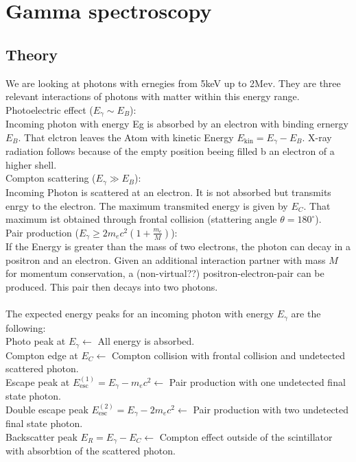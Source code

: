 \documentclass[a4paper,12pt]{article}
\begin{document}
\newpage

\section{Gamma spectroscopy}

\subsection{Theory}
We are looking at photons with ernegies from 5keV up to 2Mev. They are three relevant interactions of photons with matter within this energy range.\\
Photoelectric effect ($E_\gamma \sim E_B$):\\
Incoming photon with energy Eg is absorbed by an electron with binding ernergy $E_B$. That elctron leaves the Atom with kinetic Energy $E_{\mathrm{kin}} = E_\gamma - E_B$. X-ray radiation follows because of the empty position beeing filled b an electron of a higher shell.\\
Compton scattering ($E_\gamma \gg E_B$):\\
Incoming Photon is scattered at an electron. It is not absorbed but transmits enrgy to the electron. The maximum transmited energy is given by $E_C$. That maximum ist obtained through frontal collision (stattering angle $\theta = 180^\circ$).\\
Pair production ($E_\gamma \geqslant 2m_ec^2(1+\frac{m_e}{M})$):\\
If the Energy is greater than the mass of two electrons, the photon can decay in a positron and an electron. Given an additional interaction partner with mass $M$ for momentum conservation, a (non-virtual??) positron-electron-pair can be produced. This pair then decays into two photons.\\
\\
The expected energy peaks for an incoming photon with energy $E_\gamma$ are the following:\\
Photo peak at $E_\gamma \leftarrow$ All energy is absorbed.\\
Compton edge at $E_C \leftarrow$ Compton collision with frontal collision and undetected scattered photon.\\
Escape peak at $E_\mathrm{esc}^{(1)} = E_\gamma - m_ec^2 \leftarrow$ Pair production with one undetected final state photon.\\
Double escape peak $E_\mathrm{esc}^{(2)} = E_\gamma - 2m_ec^2 \leftarrow$ Pair production with two undetected final state photon.\\
Backscatter peak $E_R = E_\gamma - E_C \leftarrow$ Compton effect outside of the scintillator with absorbtion of the scattered photon.\\
\end{document}
